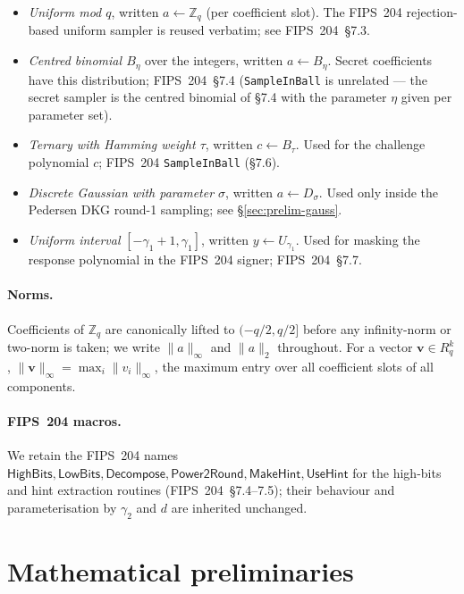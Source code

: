 \documentclass[11pt,a4paper]{article}
\theoremstyle{definition}
\theoremstyle{remark}
\newcommand{\Rq}{R_q}
\newcommand{\Zq}{\mathbb{Z}_q}
\newcommand{\HighBits}{\mathsf{HighBits}}
\newcommand{\LowBits}{\mathsf{LowBits}}
\newcommand{\MakeHint}{\mathsf{MakeHint}}
\newcommand{\UseHint}{\mathsf{UseHint}}
\newcommand{\Power}{\mathsf{Power2Round}}
\newcommand{\Decompose}{\mathsf{Decompose}}
\begin{document}
\begin{itemize}[leftmargin=*]
\item \emph{Uniform mod $q$}, written $a \gets \Zq$ (per coefficient
slot). The FIPS~204 rejection-based uniform sampler is reused
verbatim; see FIPS~204~\S7.3.
\item \emph{Centred binomial $B_\eta$} over the integers, written
$a \gets B_\eta$. Secret coefficients have this distribution;
FIPS~204~\S7.4 (\texttt{SampleInBall} is unrelated --- the secret
sampler is the centred binomial of \S7.4 with the parameter
$\eta$ given per parameter set).
\item \emph{Ternary with Hamming weight $\tau$}, written
$c \gets B_\tau$. Used for the challenge polynomial $c$; FIPS~204
\texttt{SampleInBall} (\S7.6).
\item \emph{Discrete Gaussian with parameter $\sigma$}, written
$a \gets D_\sigma$. Used only inside the Pedersen DKG round-1
sampling; see \S\ref{sec:prelim-gauss}.
\item \emph{Uniform interval} $[-\gamma_1 + 1, \gamma_1]$, written
$y \gets U_{\gamma_1}$. Used for masking the response polynomial in
the FIPS~204 signer; FIPS~204~\S7.7.
\end{itemize}

\paragraph{Norms.} Coefficients of $\Zq$ are canonically lifted to
$(-q/2, q/2]$ before any infinity-norm or two-norm is taken; we
write $\|a\|_\infty$ and $\|a\|_2$ throughout. For a vector
$\mathbf{v} \in \Rq^k$, $\|\mathbf{v}\|_\infty = \max_i \|v_i\|_\infty$,
the maximum entry over all coefficient slots of all components.

\paragraph{FIPS~204 macros.} We retain the FIPS~204 names
$\HighBits, \LowBits, \Decompose, \Power, \MakeHint, \UseHint$ for the
high-bits and hint extraction routines (FIPS~204~\S7.4--7.5); their
behaviour and parameterisation by $\gamma_2$ and $d$ are inherited
unchanged.

\section{Mathematical preliminaries}
\label{sec:prelim}
\end{document}
